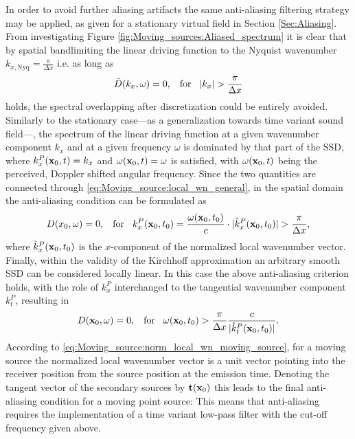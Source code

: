 In order to avoid further aliasing artifacts the same anti-aliasing filtering strategy may be applied, as given for a stationary virtual field in Section \ref{Sec:Aliasing}.
From investigating Figure \ref{fig:Moving_sources:Aliased_spectrum} it is clear that by spatial bandlimiting the linear driving function to the Nyquist wavenumber $k_{x,\mathrm{Nyq}} = \frac{\pi}{\Delta x}$ i.e. as long as 
\begin{equation}
\tilde{D}(k_x,\omega) = 0, \hspace{3mm} \text{for} \hspace{3mm}  |k_x| > \frac{\pi}{\Delta x}
\end{equation}
holds, the spectral overlapping after discretization could be entirely avoided.
Similarly to the stationary case---as a generalization towards time variant sound field---, the spectrum of the linear driving function at a given wavenumber component $k_x$ and at a given frequency $\omega$ is dominated by that part of the SSD, where $k_x^P(\mathbf{x}_0,t) = k_x$ and $\omega(\mathbf{x}_0,t) = \omega$ is satisfied, with $\omega(\mathbf{x}_0,t)$ being the perceived, Doppler shifted angular frequency.
Since the two quantities are connected through \eqref{eq:Moving_source:local_wn_general}, in the spatial domain the anti-aliasing condition can be formulated as
\begin{equation}
D(x_0,\omega) = 0, \hspace{3mm} \text{for} \hspace{3mm}  k_x^P(\mathbf{x}_0,t_0) = \frac{\omega(\mathbf{x}_0,t_0)}{c} \cdot |\hat{k}_x^P(\mathbf{x}_0,t_0)|  > \frac{\pi}{\Delta x},
\end{equation}
where $\hat{k}_x^P(\mathbf{x}_0,t_0)$ is the $x$-component of the normalized local wavenumber vector.
Finally, within the validity of the Kirchhoff approximation an arbitrary smooth SSD can be considered locally linear.
In this case the above anti-aliasing criterion holds, with the role of $k_x^P$ interchanged to the tangential wavenumber component $k_t^P$, resulting in 
\begin{equation}
D(\mathbf{x}_0,\omega) = 0, \hspace{3mm} \text{for} \hspace{3mm} \omega(\mathbf{x}_0,t_0) > \frac{\pi}{\Delta x} \frac{c}{|\hat{k}_t^P(\mathbf{x}_0,t_0)|}.
\end{equation}
According to \eqref{eq:Moving_source:norm_local_wn_moving_source}, for a moving source the normalized local wavenumber vector is a unit vector pointing into the receiver position from the source position at the emission time.
Denoting the tangent vector of the secondary sources by $\mathbf{t}(\mathbf{x}_0)$ this leads to the final anti-aliasing condition for a moving point source:
This means that anti-aliasing requires the implementation of a time variant low-pass filter with the cut-off frequency given above.

